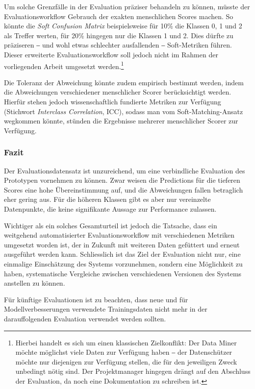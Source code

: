 Um solche Grenzfälle in der Evaluation präziser behandeln zu können, müsste der Evaluationsworkflow Gebrauch der exakten menschlichen Scores machen. So könnte die \textit{Soft Confusion Matrix} beispielsweise für 10\% die Klassen 0, 1 und 2 als Treffer werten, für 20\% hingegen nur die Klassen 1 und 2. Dies dürfte zu präziseren ‒ und wohl etwas schlechter ausfallenden ‒ Soft-Metriken führen. Dieser erweiterte Evaluationsworkflow soll jedoch nicht im Rahmen der vorliegenden Arbeit umgesetzt werden.\footnote{Hierbei handelt es sich um einen klassischen Zielkonflikt: Der Data Miner möchte möglichst viele Daten zur Verfügung haben ‒ der Datenschützer möchte nur diejenigen zur Verfügung stellen, die für den jeweiligen Zweck unbedingt nötig sind. Der Projektmanager hingegen drängt auf den Abschluss der Evaluation, da noch eine Dokumentation zu schreiben ist.}

Die Toleranz der Abweichung könnte zudem empirisch bestimmt werden, indem die Abweichungen verschiedener menschlicher Scorer berücksichtigt werden. Hierfür stehen jedoch wissenschaftlich fundierte Metriken zur Verfügung (Stichwort \textit{Interclass Correlation}, ICC), sodass man vom Soft-Matching-Ansatz wegkommen könnte, stünden die Ergebnisse mehrerer menschlicher Scorer zur Verfügung.

\subsubsection{Fazit}

Der Evaluationsdatensatz ist unzureichend, um eine verbindliche Evaluation des Prototypen vornehmen zu können. Zwar weisen die Predictions für die tieferen Scores eine hohe Übereinstimmung auf, und die Abweichungen fallen betraglich eher gering aus. Für die höheren Klassen gibt es aber nur vereinzelte Datenpunkte, die keine signifikante Aussage zur Performance zulassen.

Wichtiger als ein solches Gesamturteil ist jedoch die Tatsache, dass ein weitgehend automatisierter Evaluationsworkflow mit verschiedenen Metriken umgesetzt worden ist, der in Zukunft mit weiteren Daten gefüttert und erneut ausgeführt werden kann. Schliesslich ist das Ziel der Evaluation nicht nur, eine einmalige Einschätzung des Systems vorzunehmen, sondern eine Möglichkeit zu haben, systematische Vergleiche zwischen verschiedenen Versionen des Systems anstellen zu können.

Für künftige Evaluationen ist zu beachten, dass neue und für Modellverbesserungen verwendete Trainingsdaten nicht mehr in der darauffolgenden Evaluation verwendet werden sollten.


